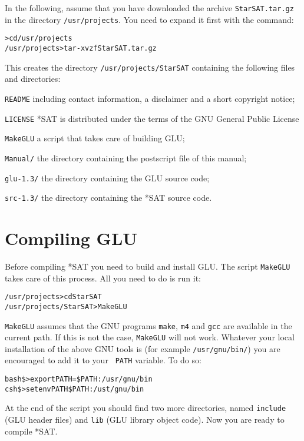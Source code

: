 \documentclass[12pt]{report}
\begin{document}
In the following, assume that you have downloaded the archive 
{\tt StarSAT.tar.gz} in the directory {\tt /usr/projects}.  You 
need to expand it first with the command:
\begin{alltt} 
   > cd /usr/projects
   /usr/projects> tar -xvzf StarSAT.tar.gz
\end{alltt}
This creates the directory {\tt /usr/projects/StarSAT} containing the
following files and directories:
\begin{description}
\item{\tt README} including contact information, a disclaimer and a
short copyright notice;
\item{\tt LICENSE} *SAT is distributed under the terms of the GNU General
Public License
\item{\tt MakeGLU} a script that takes care of building GLU;
\item{\tt Manual/} the directory containing the 
postscript file of this manual;
\item{\tt glu-1.3/} the directory containing the GLU source code;
\item{\tt src-1.3/} the directory containing the *SAT source code.
\end{description}

\section{Compiling GLU}
\label{sec:glu}

Before compiling *SAT you need to build and install GLU. The script
{\tt MakeGLU} takes care of this process. All you need to do is run
it:
\begin{alltt}
/usr/projects>cd StarSAT
/usr/projects/StarSAT>MakeGLU
\end{alltt}
{\tt MakeGLU} assumes that the GNU programs {\tt make}, {\tt m4} and
{\tt gcc}  are available in the current path. 
If this is not the case, {\tt MakeGLU} will not work. 
Whatever your local installation of the above GNU tools is (for example
{\tt /usr/gnu/bin/}) you are encouraged to add it to your {\tt
PATH} variable. To do so:
\begin{alltt}
bash\$>export PATH=\$PATH:/usr/gnu/bin
csh\$>setenv PATH \$PATH:/ust/gnu/bin
\end{alltt}

At the end of the script you should find two more directories, named
{\tt include} (GLU header files) and {\tt lib} (GLU library object code). 
Now you are ready to compile *SAT.
\end{document}
